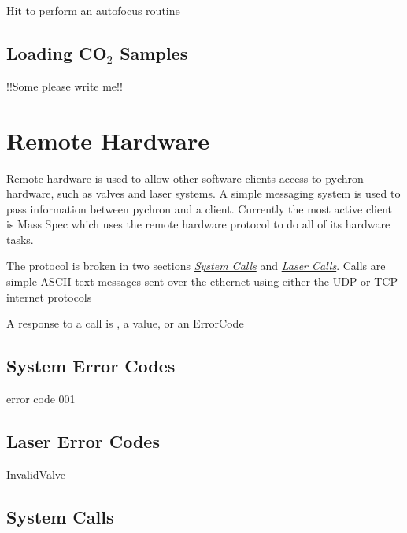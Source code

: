 \documentclass[letterpaper,10pt,english]{sphinxmanual}
\begin{document}
Hit  to perform an autofocus routine


\section{Loading CO$_{\text{2}}$ Samples}
\label{co2_loading:loading-co2-samples}\label{co2_loading::doc}
!!Some please write me!!


\chapter{Remote Hardware}
\label{remote_hardware:remote-hardware}\label{remote_hardware::doc}
Remote hardware is used to allow other software clients access to pychron hardware, such as valves and laser systems.
A simple messaging system is used to pass information between pychron and a client. Currently the most
active client is Mass Spec which uses the remote hardware protocol to do all of its hardware tasks.

The protocol is broken in two sections {\hyperref[remote_hardware:system-calls-label]{\emph{System Calls}}} and {\hyperref[remote_hardware:laser-calls-label]{\emph{Laser Calls}}}.
Calls are simple ASCII text messages sent over the ethernet using either the \href{http://en.wikipedia.org/wiki/User\_Datagram\_Protocol}{UDP}
or \href{http://en.wikipedia.org/wiki/Transmission\_Control\_Protocol}{TCP} internet protocols

A response to a call is , a value, or an ErrorCode


\section{System Error Codes}
\label{system_errors::doc}\label{system_errors:system-error-codes}\label{system_errors:invalid-valve-error}

\begin{fulllineitems}
error code 001

\end{fulllineitems}



\section{Laser Error Codes}
\label{laser_errors:laser-error-codes}\label{laser_errors::doc}
InvalidValve


\section{System Calls}
\label{remote_hardware:system-calls-label}\label{remote_hardware:system-calls}
\end{document}
